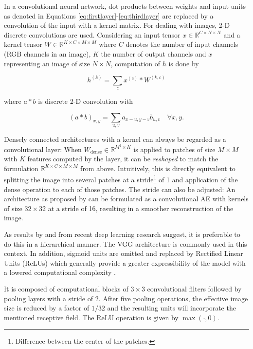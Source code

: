 \documentclass[10pt,twocolumn,a4paper]{article}
\newcommand{\abbrpl}[2]{#1s (#2s)}
\newcommand{\IR}{\mathds{R}}
\begin{document}
In a convolutional neural network, dot products between weights and input units as denoted in Equations \eqref{eq:firstlayer}-\eqref{eq:thirdlayer} are replaced by a convolution of the input with a kernel matrix.
For dealing with images, 2-D discrete convolutions are used.
Considering an input tensor $x \in \IR^{C \times N \times N}$ and a kernel tensor $W \in \IR^{K \times C \times M \times M}$ where $C$ denotes the number of input channels (\eg RGB channels in an image), $K$ the number of output channels and $x$ representing an image of size $N \times N$, computation of $h$ is done by

\begin{equation}
    h^{(k)} = \sum_c x^{(c)} * W^{(k, c)}
\end{equation}

where $a * b$ is discrete 2-D convolution with

\begin{equation}
    (a * b)_{x,y} = \sum_{u, v} a_{x-u, y-v} b_{u, v} \quad \forall x, y .
\end{equation}

Densely connected architectures with a kernel can always be regarded as a convolutional layer: When $W_\text{dense} \in \IR^{M^2 \times K}$ is applied to patches of size $M \times M$ with $K$ features computed by the layer, it can be \emph{reshaped} to match the formulation $\IR^{K \times C \times M \times M}$ from above.
Intuitively, this is directly equivalent to splitting the image into several patches at a stride\footnote{Difference between the center of the patches.} of 1 and application of the dense operation to each of those patches.
The stride can also be adjusted: An architecture as proposed by \cite{Mousavi2015} can be formulated as a convolutional AE with kernels of size $32 \times 32$ at a stride of 16, resulting in a smoother reconstruction of the image. 

As results by \cite{Szegedy15} and \cite{Simonyan14} from recent deep learning research suggest, it is preferable to do this in a hierarchical manner.
The VGG architecture \cite{Simonyan14} is commonly used in this context.
In addition, sigmoid units are omitted and replaced by \abbrpl{Rectified Linear Unit}{ReLU} which generally provide a greater expressibility of the model with a lowered computational complexity \cite{Nair2010}.

It is composed of computational blocks of $3 \times 3$ convolutional filters followed by pooling layers with a stride of $2$.
After five pooling operations, the effective image size is reduced by a factor of $1/32$ and the resulting units will incorporate the mentioned receptive field.
The ReLU operation is given by $\max(\cdot, 0)$.
\end{document}

